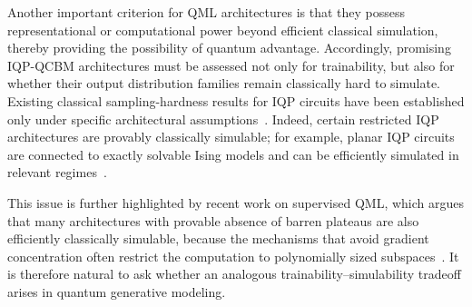 \documentclass{article}
\theoremstyle{plain}
\theoremstyle{definition}
\theoremstyle{remark}
\begin{document}
Another important criterion for QML architectures is that they possess representational or computational power beyond efficient classical simulation, thereby providing the possibility of quantum advantage. Accordingly, promising IQP-QCBM architectures must be assessed not only for trainability, but also for whether their output distribution families remain classically hard to simulate. Existing classical sampling-hardness results for IQP circuits have been established only under specific architectural assumptions~\citep{Bremner10,Bremner16,Bremner17}. Indeed, certain restricted IQP architectures are provably classically simulable; for example, planar IQP circuits are connected to exactly solvable Ising models and can be efficiently simulated in relevant regimes~\citep{Fujii17}.

This issue is further highlighted by recent work on supervised QML, which argues that many architectures with provable absence of barren plateaus are also efficiently classically simulable, because the mechanisms that avoid gradient concentration often restrict the computation to polynomially sized subspaces~\citep{Cerezo2025Simulability}. It is therefore natural to ask whether an analogous trainability--simulability tradeoff arises in quantum generative modeling.
\end{document}
